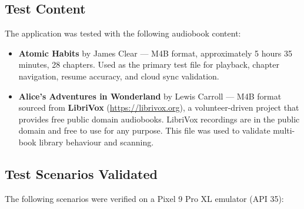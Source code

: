 \documentclass[11pt,a4paper]{article}
\begin{document}
\subsection{Test Content}

The application was tested with the following audiobook content:

\begin{itemize}[noitemsep]
    \item \textbf{Atomic Habits} by James Clear --- M4B format, approximately 5 hours 35 minutes, 28 chapters. Used as the primary test file for playback, chapter navigation, resume accuracy, and cloud sync validation.
    \item \textbf{Alice's Adventures in Wonderland} by Lewis Carroll --- M4B format sourced from \textbf{LibriVox} (\url{https://librivox.org}), a volunteer-driven project that provides free public domain audiobooks. LibriVox recordings are in the public domain and free to use for any purpose. This file was used to validate multi-book library behaviour and scanning.
\end{itemize}

\subsection{Test Scenarios Validated}

The following scenarios were verified on a Pixel 9 Pro XL emulator (API 35):
\end{document}
